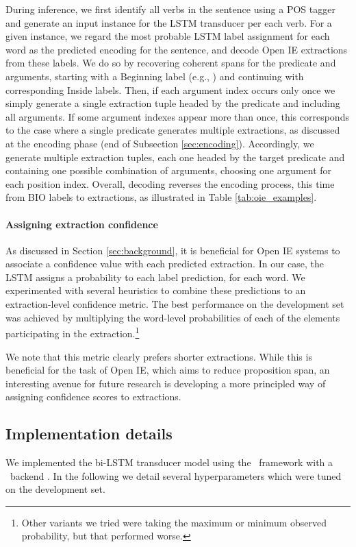 During inference, we first identify all verbs in the sentence using a POS tagger and generate an input instance for the LSTM transducer per each verb.
For a given instance, we regard the most probable LSTM label assignment for each word as the predicted encoding for the sentence, and decode Open IE extractions from these labels.
We do so by recovering coherent spans for the predicate and arguments, starting with a Beginning label (e.g., ) and continuing with corresponding Inside labels.
Then, if each argument index occurs only once we simply generate a single extraction tuple headed by the predicate and including all arguments. If some argument indexes appear more than once, this corresponds to the case where a single predicate generates multiple extractions, as discussed at the encoding phase (end of Subsection \ref{sec:encoding}). Accordingly, we generate multiple extraction tuples, each one headed by the target predicate and containing one possible combination of arguments, choosing one argument for each position index. Overall, decoding reverses the encoding process, this time from BIO labels to extractions, as illustrated in Table \ref{tab:oie_examples}.


\paragraph{Assigning extraction confidence}
As discussed in Section \ref{sec:background}, it is beneficial for Open IE systems to associate a confidence value with each predicted extraction.
In our case, the LSTM assigns a probability to each label prediction, for each word.
We experimented with several heuristics to combine these predictions to an extraction-level confidence metric.
The best performance on the development set was achieved by multiplying the word-level probabilities of each
of the elements participating in the extraction.\footnote{Other variants we tried were taking the maximum or
minimum observed probability, but that performed worse.}

We note that this metric clearly prefers shorter extractions.
While this is beneficial for the task of Open IE, which aims to reduce proposition span, an interesting
avenue for future research is developing a more principled way of assigning confidence scores to extractions.


\subsection{Implementation details}
We implemented the bi-LSTM transducer model using the \keras\ framework \cite{chollet2015} with a \tensorflow\ backend \cite{tensorflow2015-whitepaper}.
In the following we detail several hyperparameters which were tuned on the development set.

